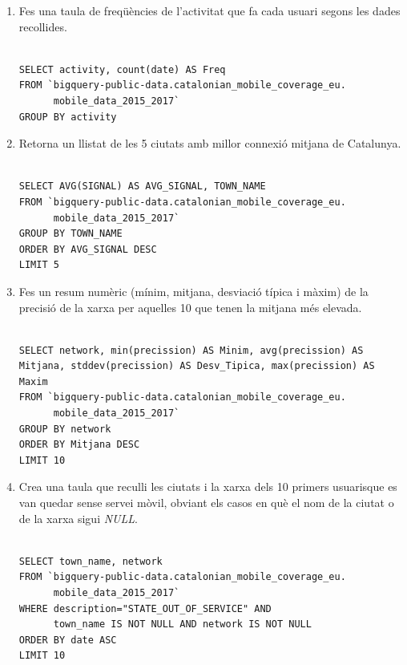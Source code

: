 \documentclass[12pt,longbibliography]{article}
\theoremstyle{definition}
\theoremstyle{remark}
\begin{document}
\begin{enumerate}

\item Fes una taula de freqüències de l'activitat que fa cada usuari segons les dades recollides.

\begin{Verbatim}[frame=single]

SELECT activity, count(date) AS Freq
FROM `bigquery-public-data.catalonian_mobile_coverage_eu.
      mobile_data_2015_2017`
GROUP BY activity

\end{Verbatim}

\item Retorna un llistat de les 5 ciutats amb millor connexió mitjana de Catalunya.

\begin{Verbatim}[frame=single]

SELECT AVG(SIGNAL) AS AVG_SIGNAL, TOWN_NAME
FROM `bigquery-public-data.catalonian_mobile_coverage_eu.
      mobile_data_2015_2017`
GROUP BY TOWN_NAME
ORDER BY AVG_SIGNAL DESC
LIMIT 5
\end{Verbatim}

\item Fes un resum numèric (mínim, mitjana, desviació típica i màxim) de la precisió de la xarxa per aquelles 10 que tenen la mitjana més elevada.

\begin{Verbatim}[frame=single]

SELECT network, min(precission) AS Minim, avg(precission) AS 
Mitjana, stddev(precission) AS Desv_Tipica, max(precission) AS 
Maxim
FROM `bigquery-public-data.catalonian_mobile_coverage_eu.
      mobile_data_2015_2017`
GROUP BY network
ORDER BY Mitjana DESC
LIMIT 10
\end{Verbatim}

\item Crea una taula que reculli les ciutats i la xarxa dels 10 primers usuarisque es van quedar sense servei mòvil, obviant els casos en què el nom de la ciutat o de la xarxa sigui \textit{NULL}.

\begin{Verbatim}[frame=single]

SELECT town_name, network
FROM `bigquery-public-data.catalonian_mobile_coverage_eu.
      mobile_data_2015_2017`
WHERE description="STATE_OUT_OF_SERVICE" AND 
      town_name IS NOT NULL AND network IS NOT NULL
ORDER BY date ASC
LIMIT 10
\end{Verbatim}


\end{enumerate}
\end{document}
